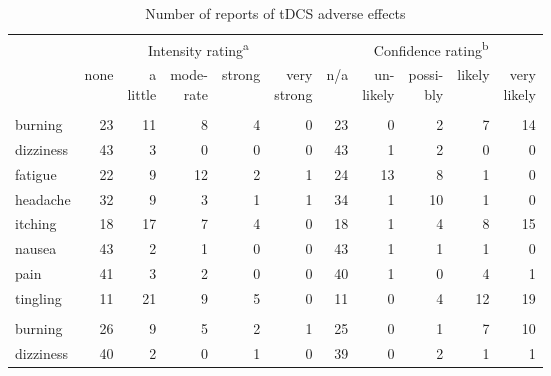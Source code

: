 \documentclass[11pt,]{memoir}
\begin{document}
\begingroup\fontsize{8}{10}\selectfont

\begin{longtable}{lrrrrrrrrrr}
\caption{\label{tab:tab-AB-tDCS-AE}Number of reports of tDCS adverse effects}\\
\toprule
\multicolumn{1}{c}{ } & \multicolumn{5}{c}{Intensity rating\textsuperscript{a}} & \multicolumn{5}{c}{Confidence rating\textsuperscript{b}} \\
\cmidrule(l{3pt}r{3pt}){2-6} \cmidrule(l{3pt}r{3pt}){7-11}
  & none & \makecell[c]{a\\little} & \makecell[c]{mode-\\rate} & strong & \makecell[c]{very\\strong} & n/a & \makecell[c]{un-\\likely} & \makecell[c]{possi-\\bly} & likely & \makecell[c]{very\\likely}\\
\midrule
\addlinespace[0.3em]
\multicolumn{11}{l}{\textbf{anodal session}}\\
\hspace{1em}burning & 23 & 11 & 8 & 4 & 0 & 23 & 0 & 2 & 7 & 14\\
\hspace{1em}dizziness & 43 & 3 & 0 & 0 & 0 & 43 & 1 & 2 & 0 & 0\\
\hspace{1em}fatigue & 22 & 9 & 12 & 2 & 1 & 24 & 13 & 8 & 1 & 0\\
\hspace{1em}headache & 32 & 9 & 3 & 1 & 1 & 34 & 1 & 10 & 1 & 0\\
\hspace{1em}itching & 18 & 17 & 7 & 4 & 0 & 18 & 1 & 4 & 8 & 15\\
\hspace{1em}nausea & 43 & 2 & 1 & 0 & 0 & 43 & 1 & 1 & 1 & 0\\
\hspace{1em}pain & 41 & 3 & 2 & 0 & 0 & 40 & 1 & 0 & 4 & 1\\
\hspace{1em}tingling & 11 & 21 & 9 & 5 & 0 & 11 & 0 & 4 & 12 & 19\\
\addlinespace[0.3em]
\multicolumn{11}{l}{\textbf{cathodal session}}\\
\hspace{1em}burning & 26 & 9 & 5 & 2 & 1 & 25 & 0 & 1 & 7 & 10\\
\hspace{1em}dizziness & 40 & 2 & 0 & 1 & 0 & 39 & 0 & 2 & 1 & 1\\

\end{longtable}
\end{document}
